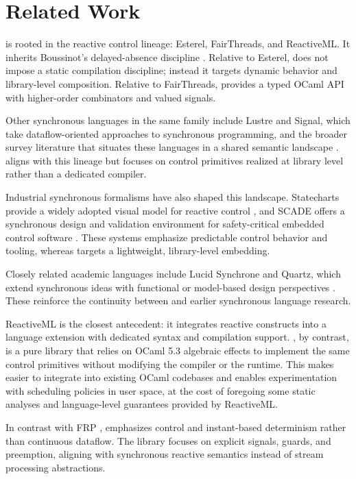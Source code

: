 \section{Related Work}
\tempo{} is rooted in the reactive control lineage: Esterel, FairThreads, and
ReactiveML. It inherits Boussinot's delayed-absence discipline
\cite{esterel1992,fairthreads2003,reactiveml2005}. Relative to Esterel, \tempo{}
does not impose a static compilation discipline; instead it targets dynamic
behavior and library-level composition. Relative to FairThreads, \tempo{} provides
a typed OCaml API with higher-order combinators and valued signals.

Other synchronous languages in the same family include Lustre and Signal, which
take dataflow-oriented approaches to synchronous programming, and the broader
survey literature that situates these languages in a shared semantic landscape
\cite{lustre1991,signal1987,benveniste2003}. \tempo{} aligns with this lineage but
focuses on control primitives realized at library level rather than a dedicated
compiler.

Industrial synchronous formalisms have also shaped this landscape. Statecharts
provide a widely adopted visual model for reactive control
\cite{harel1987statecharts}, and SCADE offers a synchronous design and
validation environment for safety-critical embedded control software
\cite{berry2007scade}. These systems emphasize predictable control behavior and
tooling, whereas \tempo{} targets a lightweight, library-level embedding.

Closely related academic languages include Lucid Synchrone and Quartz, which
extend synchronous ideas with functional or model-based design perspectives
\cite{caspihamonpouzet2008lucid,schneider2017quartz}. These reinforce the
continuity between \tempo{} and earlier synchronous language research.

ReactiveML is the closest antecedent: it integrates reactive constructs into a
language extension with dedicated syntax and compilation support. \tempo{}, by
contrast, is a pure library that relies on OCaml 5.3 algebraic effects to
implement the same control primitives without modifying the compiler or the
runtime. This makes \tempo{} easier to integrate into existing OCaml codebases and
enables experimentation with scheduling policies in user space, at the cost of
foregoing some static analyses and language-level guarantees provided by
ReactiveML.

In contrast with FRP \cite{frp1997}, \tempo{} emphasizes control and instant-based
determinism rather than continuous dataflow. The library focuses on explicit
signals, guards, and preemption, aligning with synchronous reactive semantics
instead of stream processing abstractions.

